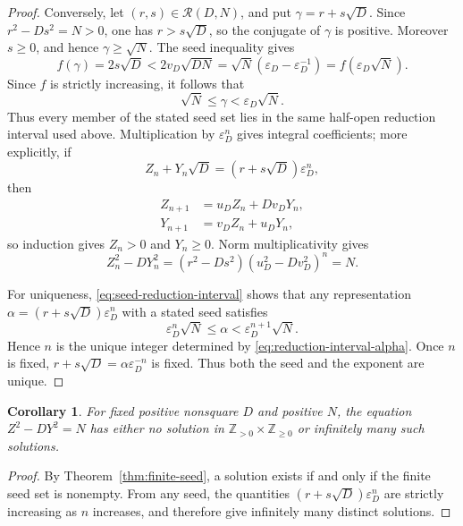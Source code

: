 \documentclass[11pt,a4paper]{amsart}
\newtheorem{corollary}[theorem]{Corollary}
\theoremstyle{definition}
\newcommand{\Z}{\mathbb Z}
\newcommand{\eps}{\varepsilon}
\numberwithin{equation}{section}
\begin{document}
\begin{proof}
Conversely, let \((r,s)\in\mathcal R(D,N)\), and put
\(\gamma=r+s\sqrt D\).  Since \(r^2-Ds^2=N>0\), one has
\(r>s\sqrt D\), so the conjugate of \(\gamma\) is positive.  Moreover
\(s\geq0\), and hence \(\gamma\geq\sqrt N\).  The seed inequality gives
\begin{equation}
 f(\gamma)=2s\sqrt D<2v_D\sqrt{DN}
 =\sqrt N(\eps_D-\eps_D^{-1})=f(\eps_D\sqrt N).
 \label{eq:seed-implies-interval}
\end{equation}
Since \(f\) is strictly increasing, it follows that
\begin{equation}
 \sqrt N\leq\gamma<\eps_D\sqrt N.
 \label{eq:seed-reduction-interval}
\end{equation}
Thus every member of the stated seed set lies in the same half-open reduction
interval used above.  Multiplication by \(\eps_D^n\) gives integral coefficients; more
explicitly, if
\begin{equation}
 Z_n+Y_n\sqrt D=(r+s\sqrt D)\eps_D^n,
\end{equation}
then
\begin{equation}
 \begin{aligned}
 Z_{n+1}&=u_DZ_n+Dv_DY_n,\\
 Y_{n+1}&=v_DZ_n+u_DY_n,
 \end{aligned}
\end{equation}
so induction gives \(Z_n>0\) and \(Y_n\geq0\).  Norm multiplicativity gives
\begin{equation}
 Z_n^2-DY_n^2=(r^2-Ds^2)(u_D^2-Dv_D^2)^n=N.
\end{equation}

For uniqueness, \eqref{eq:seed-reduction-interval} shows that any representation
\(\alpha=(r+s\sqrt D)\eps_D^n\) with a stated seed satisfies
\begin{equation}
 \eps_D^n\sqrt N\leq\alpha<\eps_D^{n+1}\sqrt N.
\end{equation}
Hence \(n\) is the unique integer determined by
\eqref{eq:reduction-interval-alpha}.  Once \(n\) is fixed,
\(r+s\sqrt D=\alpha\eps_D^{-n}\) is fixed.  Thus both the seed and the exponent are
unique.
\end{proof}

\begin{corollary}
\label{cor:fiber-infinite}
For fixed positive nonsquare \(D\) and positive \(N\), the equation
\(Z^2-DY^2=N\) has either no solution in
\(\Z_{>0}\times\Z_{\geq0}\) or infinitely many such solutions.
\end{corollary}

\begin{proof}
By Theorem~\ref{thm:finite-seed}, a solution exists if and only if the finite seed
set is nonempty.  From any seed, the quantities
\((r+s\sqrt D)\eps_D^n\) are strictly increasing as \(n\) increases, and therefore
give infinitely many distinct solutions.
\end{proof}
\end{document}
